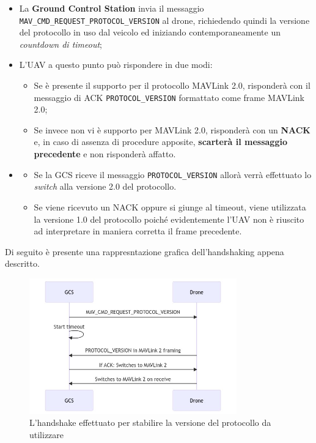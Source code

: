 \documentclass[a4paper, 12pt, oneside]{article}
\begin{document}
\begin{itemize}
    \item La \textbf{Ground Control Station} invia il messaggio \texttt{MAV\_CMD\_REQUEST\_PROTOCOL\_VERSION} al drone, richiedendo quindi la versione del protocollo in uso dal veicolo ed iniziando contemporaneamente un \textit{countdown di timeout};
    \item L'UAV a questo punto può rispondere in due modi: \begin{itemize}
        \item Se è presente il supporto per il protocollo MAVLink 2.0, risponderà con il messaggio di ACK \texttt{PROTOCOL\_VERSION} formattato come frame MAVLink 2.0;
        \item Se invece non vi è supporto per MAVLink 2.0, risponderà con un \textbf{NACK} e, in caso di assenza di procedure apposite, \textbf{scarterà il messaggio precedente} e non risponderà affatto.
    \end{itemize}
    \item \begin{itemize}
        \item Se la GCS riceve il messaggio \texttt{PROTOCOL\_VERSION} allorà verrà effettuato lo \textit{switch} alla versione 2.0 del protocollo.
        \item Se viene ricevuto un NACK oppure si giunge al timeout, viene utilizzata la versione 1.0 del protocollo poiché evidentemente l'UAV non è riuscito ad interpretare in maniera corretta il frame precedente.
        \end{itemize} 
\end{itemize}

\newpage

Di seguito è presente una rappresntazione grafica dell'handshaking appena descritto.

\begin{figure}[H]
    \centering
    \includegraphics[width=0.8\textwidth]{images/handshake_mavlink.jpeg}
    \caption{L'handshake effettuato per stabilire la versione del protocollo da utilizzare}
\end{figure}
\end{document}
